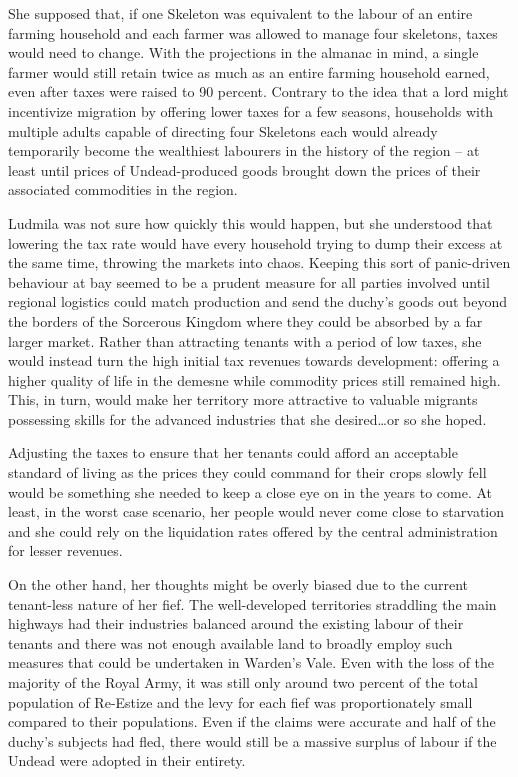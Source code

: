  

She supposed that, if one Skeleton was equivalent to the labour of an entire farming household and each farmer was allowed to manage four skeletons, taxes would need to change. With the projections in the almanac in mind, a single farmer would still retain twice as much as an entire farming household earned, even after taxes were raised to 90 percent. Contrary to the idea that a lord might incentivize migration by offering lower taxes for a few seasons, households with multiple adults capable of directing four Skeletons each would already temporarily become the wealthiest labourers in the history of the region – at least until prices of Undead-produced goods brought down the prices of their associated commodities in the region.

 

Ludmila was not sure how quickly this would happen, but she understood that lowering the tax rate would have every household trying to dump their excess at the same time, throwing the markets into chaos. Keeping this sort of panic-driven behaviour at bay seemed to be a prudent measure for all parties involved until regional logistics could match production and send the duchy’s goods out beyond the borders of the Sorcerous Kingdom where they could be absorbed by a far larger market. Rather than attracting tenants with a period of low taxes, she would instead turn the high initial tax revenues towards development: offering a higher quality of life in the demesne while commodity prices still remained high. This, in turn, would make her territory more attractive to valuable migrants possessing skills for the advanced industries that she desired…or so she hoped.

 

Adjusting the taxes to ensure that her tenants could afford an acceptable standard of living as the prices they could command for their crops slowly fell would be something she needed to keep a close eye on in the years to come. At least, in the worst case scenario, her people would never come close to starvation and she could rely on the liquidation rates offered by the central administration for lesser revenues.

 

On the other hand, her thoughts might be overly biased due to the current tenant-less nature of her fief. The well-developed territories straddling the main highways had their industries balanced around the existing labour of their tenants and there was not enough available land to broadly employ such measures that could be undertaken in Warden’s Vale. Even with the loss of the majority of the Royal Army, it was still only around two percent of the total population of Re-Estize and the levy for each fief was proportionately small compared to their populations. Even if the claims were accurate and half of the duchy’s subjects had fled, there would still be a massive surplus of labour if the Undead were adopted in their entirety.

